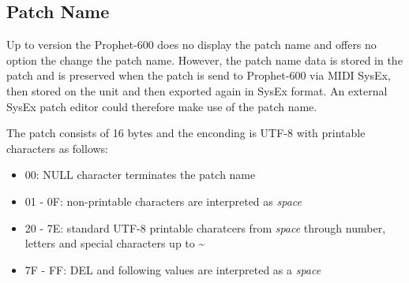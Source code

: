 \subsection{Patch Name}

Up to version \version the Prophet-600 does no display the patch name and offers no option the change the patch name. However, the patch name data is stored in the patch and is preserved when the patch is send to Prophet-600 via MIDI SysEx, then stored on the unit and then exported again in SysEx format. An external SysEx patch editor could therefore make use of the patch name.

The patch consists of 16 bytes and the enconding is UTF-8 with printable characters as follows:

\begin{itemize}
  \item 00: NULL character terminates the patch name
  \item 01 - 0F: non-printable characters are interpreted as \textit{space}
  \item 20 - 7E: standard UTF-8 printable charatcers from \textit{space} through number, letters and special characters up to \textasciitilde
  \item 7F - FF: DEL and following values are interpreted as a \textit{space}
\end{itemize}
 
